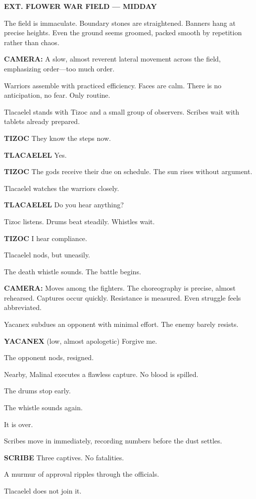 \documentclass[12pt]{article}
\begin{document}
\textbf{EXT. FLOWER WAR FIELD — MIDDAY}

The field is immaculate. Boundary stones are straightened. Banners hang at precise heights. Even the ground seems groomed, packed smooth by repetition rather than chaos.

\textbf{CAMERA:} A slow, almost reverent lateral movement across the field, emphasizing order—too much order.

Warriors assemble with practiced efficiency. Faces are calm. There is no anticipation, no fear. Only routine.

Tlacaelel stands with Tizoc and a small group of observers. Scribes wait with tablets already prepared.

\textbf{TIZOC}  
They know the steps now.

\textbf{TLACAELEL}  
Yes.

\textbf{TIZOC}  
The gods receive their due on schedule.  
The sun rises without argument.

Tlacaelel watches the warriors closely.

\textbf{TLACAELEL}  
Do you hear anything?

Tizoc listens. Drums beat steadily. Whistles wait.

\textbf{TIZOC}  
I hear compliance.

Tlacaelel nods, but uneasily.

The death whistle sounds. The battle begins.

\textbf{CAMERA:} Moves among the fighters. The choreography is precise, almost rehearsed. Captures occur quickly. Resistance is measured. Even struggle feels abbreviated.

Yacanex subdues an opponent with minimal effort. The enemy barely resists.

\textbf{YACANEX}  
(low, almost apologetic)  
Forgive me.

The opponent nods, resigned.

Nearby, Malinal executes a flawless capture. No blood is spilled.

The drums stop early.

The whistle sounds again.

It is over.

Scribes move in immediately, recording numbers before the dust settles.

\textbf{SCRIBE}  
Three captives.  
No fatalities.

A murmur of approval ripples through the officials.

Tlacaelel does not join it.
\end{document}
